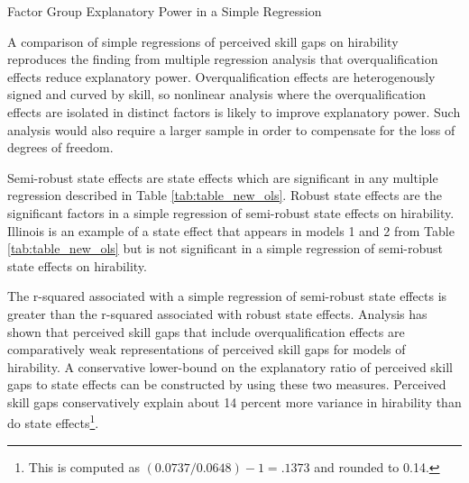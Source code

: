 \documentclass[review]{elsarticle}
\begin{document}
\begin{table}
    \caption{Factor Group Explanatory Power in a Simple Regression}
    \resizebox{\columnwidth}{!}{
        
    }
    \label{tab:explantory_power}
\end{table}

A comparison of simple regressions of perceived skill gaps on hirability reproduces the finding from multiple regression analysis that overqualification effects reduce explanatory power.
Overqualification effects are heterogenously signed and curved by skill, so nonlinear analysis where the overqualification effects are isolated in distinct factors is likely to improve explanatory power.
Such analysis would also require a larger sample in order to compensate for the loss of degrees of freedom.

Semi-robust state effects are state effects which are significant in any multiple regression described in Table \ref{tab:table_new_ols}.
Robust state effects are the significant factors in a simple regression of semi-robust state effects on hirability.
Illinois is an example of a state effect that appears in models 1 and 2 from Table \ref{tab:table_new_ols} but is not significant in a simple regression of semi-robust state effects on hirability.

The r-squared associated with a simple regression of semi-robust state effects is greater than the r-squared associated with robust state effects.
Analysis has shown that perceived skill gaps that include overqualification effects are comparatively weak representations of perceived skill gaps for models of hirability.
A conservative lower-bound on the explanatory ratio of perceived skill gaps to state effects can be constructed by using these two measures.
Perceived skill gaps conservatively explain about 14 percent more variance in hirability than do state effects\footnote{
    This is computed as $(0.0737 / 0.0648) - 1 = .1373$ and rounded to 0.14.
}.
\end{document}
